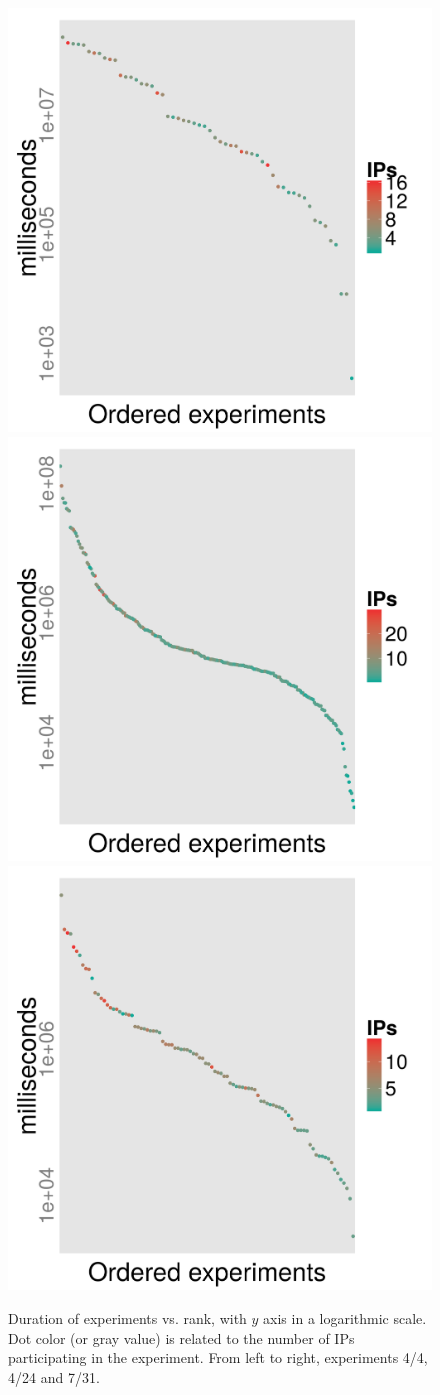 \documentclass{sig-alternate}
\begin{document}
%
\begin{figure}[!htb]
\centering
\includegraphics[width=0.32\linewidth]{time-vs-rank-OS-4-4.png}
\includegraphics[width=0.32\linewidth]{time-vs-rank-OS-4-24.png}
\includegraphics[width=0.32\linewidth]{time-vs-rank-OS-7-31.png}
\caption{Duration of experiments vs. rank, with $y$ axis in a
  logarithmic scale. Dot color (or gray value) is related to the number of IPs
  participating in the experiment. From left to right, experiments
  4/4, 4/24 and 7/31.} 
\label{fig:zipf:os}
\end{figure}
\end{document}
